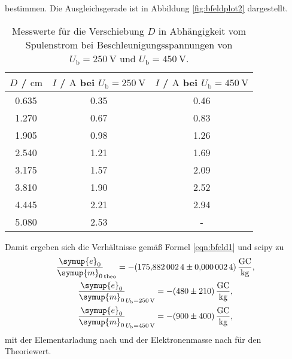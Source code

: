 bestimmen. Die Ausgleichsgerade ist in Abbildung \ref{fig:bfeldplot2} dargestellt.
\begin{table}
	\caption{Messwerte für die Verschiebung $D$ in Abhängigkeit vom Spulenstrom bei Beschleunigungsspannungen von $U_{\mathrm{b}}=\SI{250}{\volt}$ und $U_{\mathrm{b}}=\SI{450}{\volt}$.}
	\label{tab:bfeldtab}
	\centering
	\begin{tabular}{ccc}
	\toprule
		$D$ / $\si{\centi\meter}$ & $I$ / $\si{\ampere}$ bei $U_{\mathrm{b}}=\SI{250}{\volt}$ & $I$ / $\si{\ampere}$ bei $U_{\mathrm{b}}=\SI{450}{\volt}$ \\
	\midrule
		0.635 & 0.35 & 0.46 \\
		1.270 & 0.67 & 0.83 \\
		1.905 & 0.98 & 1.26 \\
		2.540 & 1.21 & 1.69 \\
		3.175 & 1.57 & 2.09 \\
		3.810 & 1.90 & 2.52 \\
		4.445 & 2.21 & 2.94 \\
		5.080 & 2.53 & - \\
	\bottomrule
	\end{tabular}
\end{table}
Damit ergeben sich die Verhältnisse gemäß Formel \eqref{eqn:bfeld1} und scipy \cite{scipy} zu
\begin{gather*}
	\frac{\symup{e}_0}{\symup{m}_0}_{\mathrm{theo}} =  -\SI{175.8820024(24)}{\giga\coulomb\per\kilo\gram} \mathrm{,} \\
	\frac{\symup{e}_0}{\symup{m}_0}_{U_{\mathrm{b}} = \SI{250}{\volt}} = -\SI{480(210)}{\giga\coulomb\per\kilo\gram} \mathrm{,} \\
	\frac{\symup{e}_0}{\symup{m}_0}_{U_{\mathrm{b}} = \SI{450}{\volt}} = -\SI{900(400)}{\giga\coulomb\per\kilo\gram} \mathrm{,}
\end{gather*}
mit der Elementarladung nach \cite{e} und der Elektronenmasse nach \cite{m} für den Theoriewert.

